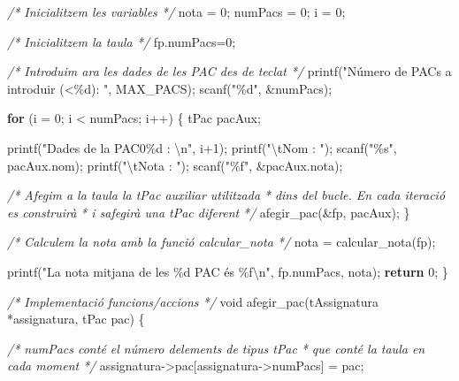 \documentclass[]{book}
\newenvironment{Shaded}{\begin{snugshade}}{\end{snugshade}}
\newcommand{\CommentTok}[1]{\textcolor[rgb]{0.56,0.35,0.01}{\textit{#1}}}
\newcommand{\ControlFlowTok}[1]{\textcolor[rgb]{0.13,0.29,0.53}{\textbf{#1}}}
\newcommand{\DataTypeTok}[1]{\textcolor[rgb]{0.13,0.29,0.53}{#1}}
\newcommand{\DecValTok}[1]{\textcolor[rgb]{0.00,0.00,0.81}{#1}}
\newcommand{\NormalTok}[1]{#1}
\newcommand{\SpecialCharTok}[1]{\textcolor[rgb]{0.00,0.00,0.00}{#1}}
\newcommand{\StringTok}[1]{\textcolor[rgb]{0.31,0.60,0.02}{#1}}
\begin{document}
\begin{Shaded}
\begin{Highlighting}[]
    \CommentTok{/* Inicialitzem les variables */}
\NormalTok{    nota = }\DecValTok{0}\NormalTok{;}
\NormalTok{    numPacs = }\DecValTok{0}\NormalTok{;}
\NormalTok{    i = }\DecValTok{0}\NormalTok{;}

    \CommentTok{/* Inicialitzem la taula */}
\NormalTok{    fp.numPacs=}\DecValTok{0}\NormalTok{;}

    \CommentTok{/* Introduim ara les dades de les PAC des de teclat */}
\NormalTok{    printf(}\StringTok{"Número de PACs a introduir (\textless{}\%d): "}\NormalTok{, MAX\_PACS);}
\NormalTok{    scanf(}\StringTok{"\%d"}\NormalTok{, \&numPacs);}

    \ControlFlowTok{for}\NormalTok{ (i = }\DecValTok{0}\NormalTok{; i \textless{} numPacs; i++) \{}
\NormalTok{        tPac pacAux;}

\NormalTok{        printf(}\StringTok{"Dades de la PAC0\%d : }\SpecialCharTok{\textbackslash{}n}\StringTok{"}\NormalTok{, i+}\DecValTok{1}\NormalTok{);}
\NormalTok{        printf(}\StringTok{"}\SpecialCharTok{\textbackslash{}t}\StringTok{Nom : "}\NormalTok{);}
\NormalTok{        scanf(}\StringTok{"\%s"}\NormalTok{, pacAux.nom);}
\NormalTok{        printf(}\StringTok{"}\SpecialCharTok{\textbackslash{}t}\StringTok{Nota : "}\NormalTok{);}
\NormalTok{        scanf(}\StringTok{"\%f"}\NormalTok{, \&pacAux.nota);}

        \CommentTok{/* Afegim a la taula la tPac auxiliar utilitzada}
\CommentTok{         * dins del bucle. En cada iteració es construirà}
\CommentTok{         * i s\textquotesingle{}afegirà una tPac diferent }
\CommentTok{         */}
\NormalTok{        afegir\_pac(\&fp, pacAux);}
\NormalTok{   \}}

   \CommentTok{/* Calculem la nota amb la funció calcular\_nota */}
\NormalTok{   nota = calcular\_nota(fp);}

\NormalTok{   printf(}\StringTok{"La nota mitjana de les \%d PAC és \%f}\SpecialCharTok{\textbackslash{}n}\StringTok{"}\NormalTok{, fp.numPacs, nota);}
   \ControlFlowTok{return} \DecValTok{0}\NormalTok{;}
\NormalTok{\}}

\CommentTok{/* Implementació funcions/accions */}
\DataTypeTok{void}\NormalTok{ afegir\_pac(tAssignatura *assignatura, tPac pac) \{}

    \CommentTok{/* numPacs conté el número d\textquotesingle{}elements de tipus tPac}
\CommentTok{     * que conté la taula en cada moment }
\CommentTok{     */}
\NormalTok{    assignatura{-}\textgreater{}pac[assignatura{-}\textgreater{}numPacs] = pac;}


\end{Highlighting}
\end{Shaded}
\end{document}
